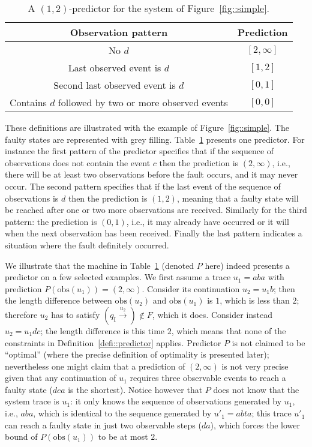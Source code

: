 \documentclass{article}
\newcommand{\qi}[0]{q_{\mathrm{I}}}
\newcommand{\trans}[1]{\stackrel{#1}{\rightarrow}}
\newcommand{\obs}[0]{\mathrm{obs}}
\begin{document}
\begin{table}[ht]
  \begin{center}
    \begin{tabular}{c | c}
      Observation pattern & Prediction\\
      \hline
      No $d$ & $[2,\infty]$\\
      Last observed event is $d$ & $[1,2]$\\
      Second last observed event is $d$ & $[0,1]$\\
      Contains $d$ followed by two or more observed events & $[0,0]$
    \end{tabular}
  \end{center}
  \caption{A $(1,2)$-predictor for the system of Figure~\ref{fig::simple}.}
  \label{tab::predictor}
\end{table}

These definitions are illustrated 
with the example of Figure~\ref{fig::simple}.  
The faulty states are represented with grey filling.  
Table~\ref{tab::predictor} presents one predictor.  
For instance the first pattern of the predictor specifies 
that if the sequence of observations does not contain the event $c$ 
then the prediction is $(2,\infty)$, 
i.e., there will be at least two observations 
before the fault occurs, and it may never occur.  
The second pattern specifies 
that if the last event of the sequence of observations is $d$ 
then the prediction is $(1,2)$, meaning that a faulty state 
will be reached after one or two more observations are received.  
Similarly for the third pattern: the prediction is $(0,1)$, 
i.e., it may already have occurred or it will 
when the next observation has been received.  
Finally the last pattern indicates a situation 
where the fault definitely occurred.  

We illustrate that the machine in Table~\ref{tab::predictor} 
(denoted $P$ here)
indeed presents a predictor on a few selected examples.  
We first assume a trace $u_1 = aba$ 
with prediction $P(\obs(u_1)) = (2,\infty)$.  
Consider its continuation $u_2 = u_1b$; 
then the length difference between $\obs(u_2)$ and $\obs(u_1)$ is $1$, 
which is less than $2$; 
therefore $u_2$ has to satisfy $(\qi \trans{u_2}) \not\in F$, 
which it does.  
Consider instead $u_2 = u_1dc$; 
the length difference is this time $2$, 
which means that none of the constraints 
in Definition~\ref{defi::predictor} applies.  
Predictor $P$ is not claimed to be ``optimal'' 
(where the precise definition of optimality is presented later); 
nevertheless one might claim 
that a prediction of $(2,\infty)$ is not very precise 
given that any continuation of $u_1$ requires three observable events 
to reach a faulty state ($dca$ is the shortest).  
Notice however that $P$ does not know that the system trace is $u_1$: 
it only knows the sequence of observations generated by $u_1$, 
i.e., $aba$, which is identical to the sequence 
generated by $u'_1 = abta$; 
this trace $u'_1$ can reach a faulty state in just two observable steps 
($da$), which forces the lower bound of $P(\obs(u_1))$ to be at most $2$.  
\end{document}
